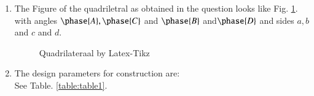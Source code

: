 \renewcommand{\theequation}{\theenumi}
\begin{enumerate}[label=\arabic*.,ref=\thesubsection.\theenumi]
\item The Figure of the quadriletral as obtained in the question looks like Fig. \ref{fig:quadrilateral}.
with angles $\phase{ A},\phase{ C}$ and $\phase{ B}$ and$\phase{D}$ and sides $a, b$ and $c$ and $d$.


\begin{figure}[!ht]
\centering
\resizebox{\columnwidth}{!}{}
\caption{Quadrilateraal by Latex-Tikz}
\label{fig:quadrilateral}	
\end{figure}
%
%
%
\item The design parameters for construction are:
\label{const:table1}
\\
\solution See Table. \ref{table:table1}. 
%
\begin{table}[ht!]
\centering

\caption{Quadrilateral ABCD}
\label{table:table1}	
\end{table}


\end{enumerate}
